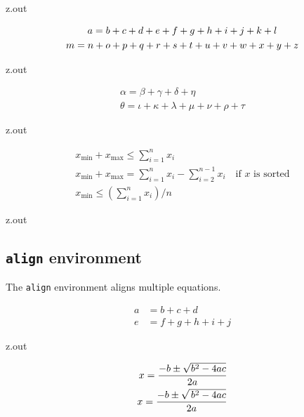 \MyIO


\begin{VerbatimOut}{z.out}

\begin{gather}
  a = b + c + d + e + f + g + h + i + j + k + l\notag\\
  m = n + o + p + q + r + s + t + u + v + w + x + y + z
\end{gather}
\end{VerbatimOut}

\MyIO


\begin{VerbatimOut}{z.out}

\begin{gather*}
  \alpha = \beta + \gamma + \delta + \eta\\
  \theta = \iota + \kappa + \lambda + \mu + \nu + \rho + \tau
\end{gather*}
\end{VerbatimOut}

\MyIO


\begin{VerbatimOut}{z.out}

\begin{gather}
  x_\text{min} + x_\text{max} \le \sum_{i=1}^n x_i\\
  x_\text{min} + x_\text{max}
    = \sum_{i=1}^n x_i - \sum_{i=2}^{n-1} x_i\quad\text{if $x$ is sorted}\\
  x_\text{min} \le \left(\sum_{i=1}^n x_i\right) / n
\end{gather}
\end{VerbatimOut}

\MyIO


\begin{VerbatimOut}{z.out}

\subsection{\texttt{align} environment}

The \verb+align+ environment aligns multiple equations.

\begin{align}
  a &= b + c + d\\
  e &= f + g + h + i + j
\end{align}
\end{VerbatimOut}

\MyIO


\begin{VerbatimOut}{z.out}

\begin{align}
  x = \frac{-b \pm \sqrt{b^2-4ac}}{2a}\notag\\
  x = \frac{-b \pm \sqrt{\,b^2-4ac}}{2a}
\end{align}
\end{VerbatimOut}
\index{\verb+\begin{align}+}
\index{\verb+\,+}

